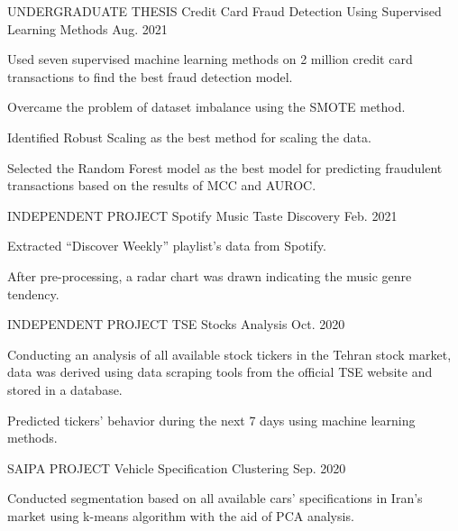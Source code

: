 \begin{cventries}

  \cventry
    {UNDERGRADUATE THESIS} %
    {Credit Card Fraud Detection Using Supervised Learning Methods} %
    { } %
    {Aug. 2021} %
    {
      \begin{cvitems} %
        \item {Used seven supervised machine learning methods on 2 million credit card transactions to find the best fraud detection model.}
        \item {Overcame the problem of dataset imbalance using the SMOTE method.}
        \item {Identified Robust Scaling as the best method for scaling the data.}
        \item {Selected the Random Forest model as the best model for predicting fraudulent transactions based on the results of MCC and AUROC.}
      \end{cvitems}
    }
  \cventry
    {INDEPENDENT PROJECT} %
    {Spotify Music Taste Discovery} %
    { } %
    {Feb. 2021} %
    {
      \begin{cvitems} %
        \item {Extracted ``Discover Weekly'' playlist's data from Spotify.}
        \item {After pre-processing, a radar chart was drawn indicating the music genre tendency.}
      \end{cvitems}
    }

  \cventry
    {INDEPENDENT PROJECT} %
    {TSE Stocks Analysis} %
    { } %
    {Oct. 2020} %
    {
      \begin{cvitems} %
        \item {Conducting an analysis of all available stock tickers in the Tehran stock market, data was derived using data scraping tools from the official TSE website and stored in a database.}
        \item {Predicted tickers' behavior during the next 7 days using machine learning methods.}
      \end{cvitems}
    }

  \cventry
    {SAIPA PROJECT} %
    {Vehicle Specification Clustering} %
    { } %
    {Sep. 2020} %
    {
      \begin{cvitems} %
        \item {Conducted segmentation based on all available cars' specifications in Iran's market using k-means algorithm with the aid of PCA analysis.}
      \end{cvitems}
    }


\end{cventries}
\pagebreak